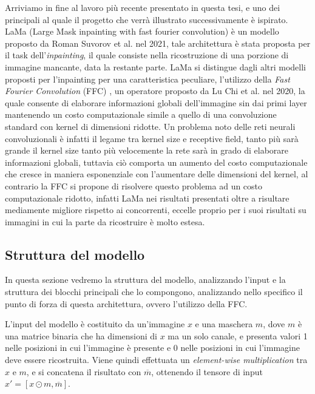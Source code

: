 Arriviamo in fine al lavoro più recente presentato in questa tesi, e uno dei principali al quale il progetto che verrà illustrato
successivamente è ispirato. LaMa (Large Mask inpainting with fast fourier convolution) è un modello proposto da Roman Suvorov et al. 
\cite{suvorov2021resolutionrobust} nel 2021, tale architettura è stata proposta per il task dell'\textit{inpainting}, il quale consiste
nella ricostruzione di una porzione di immagine mancante, data la restante parte.
LaMa si distingue dagli altri modelli proposti per l'inpainting per una caratteristica peculiare, 
l'utilizzo della \textit{Fast Fourier Convolution} (FFC) \cite{chi2020ffc}, un operatore proposto da Lu Chi et al. nel 2020, la quale
consente di elaborare informazioni globali dell'immagine sin dai primi layer mantenendo
un costo computazionale simile a quello di una convoluzione standard con kernel di dimensioni ridotte. 
Un problema noto delle reti neurali convoluzionali è infatti il legame tra kernel size e receptive field, tanto più sarà grande il kernel size
tanto più velocemente la rete sarà in grado di elaborare informazioni globali, tuttavia ciò comporta un aumento del costo computazionale
che cresce in maniera esponenziale con l'aumentare delle dimensioni del kernel, al contrario la FFC si propone di risolvere questo problema
ad un costo computazionale ridotto, infatti LaMa nei risultati presentati oltre a risultare mediamente migliore rispetto ai concorrenti,
eccelle proprio per i suoi risultati su immagini in cui la parte da ricostruire è molto estesa.

\subsection{Struttura del modello}
In questa sezione vedremo la struttura del modello, analizzando l'input e la struttura dei blocchi principali che lo compongono,
analizzando nello specifico il punto di forza di questa architettura, ovvero l'utilizzo della FFC.

L'input del modello è costituito da un'immagine $x$ e una maschera $m$, dove $m$ è una matrice binaria che ha dimensioni di $x$ ma un solo canale,
e presenta valori 1 nelle posizioni in cui l'immagine è presente e 0 nelle posizioni in cui l'immagine deve essere ricostruita.
Viene quindi effettuata un \textit{element-wise multiplication} tra $x$ e $m$, e si concatena il risultato con $\overline{m}$,
ottenendo il tensore di input $x' = [x \odot m, \overline{m}]$.\\

